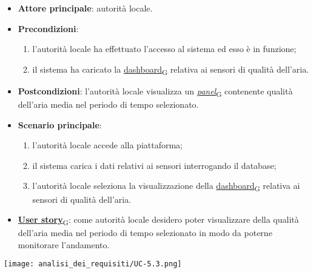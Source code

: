 \begin{itemize}
	\item \textbf{Attore principale}: autorità locale.
	\item \textbf{Precondizioni}:
	      \begin{enumerate}
		      \item l'autorità locale ha effettuato l'accesso al sistema ed esso è in funzione;
		      \item il sistema ha caricato la \href{https://7last.github.io/docs/pb/documentazione-interna/glossario\#dashboard}{dashboard\textsubscript{G}} relativa ai sensori di qualità dell'aria.
	      \end{enumerate}
	\item \textbf{Postcondizioni}: l'autorità locale visualizza un \href{https://7last.github.io/docs/pb/documentazione-interna/glossario\#panel}{\textit{panel}\textsubscript{G}} contenente qualità dell'aria media nel periodo di tempo selezionato.
	\item \textbf{Scenario principale}:
	      \begin{enumerate}
		      \item l'autorità locale accede alla piattaforma;
		      \item il sistema carica i dati relativi ai sensori interrogando il database;
		      \item l'autorità locale seleziona la visualizzazione della \href{https://7last.github.io/docs/pb/documentazione-interna/glossario\#dashboard}{dashboard\textsubscript{G}} relativa ai sensori di qualità dell'aria.
	      \end{enumerate}
	\item \href{https://7last.github.io/docs/pb/documentazione-interna/glossario\#user-story}{\textbf{User story}\textsubscript{G}}: come autorità locale desidero poter visualizzare della qualità dell'aria media nel periodo di tempo selezionato
	      in modo da poterne monitorare l'andamento.
\end{itemize}
\begin{center}
	\texttt{[image: analisi\_dei\_requisiti/UC-5.3.png]}
\end{center}


